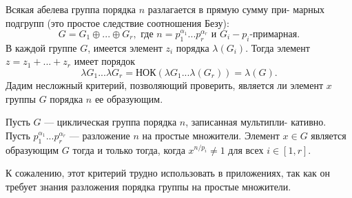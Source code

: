 \documentclass{../template/mai_book}
\begin{document}
Всякая абелева группа порядка $n$ разлагается в прямую сумму при-\linebreak
марных подгрупп (это простое следствие соотношения Безу):\linebreak
$$G = G_1\oplus...\oplus G_r, \text{ где } n=p_1^{\alpha_1}...p_r^{\alpha_r} \text{ и } G_i - p_i \text{-примарная}.$$
В каждой группе $G$, имеется элемент $z_i$ порядка $\lambda(G_i)$. Тогда элемент\linebreak
$z=z_1+...+z_r$ имеет порядок
$$\lambda{G_1}...\lambda{G_r} = \text{НОК}(\lambda{G_1}...\lambda(G_r)) = \lambda(G).$$
\newpage
Дадим несложный критерий, позволяющий проверить, является ли\linebreak
элемент $x$ группы $G$ порядка $n$ ее образующим.
\begin{predl}
Пусть $G$ — циклическая группа порядка $n$, записанная мультипли­-\linebreak
кативно. Пусть $p_1^{\alpha_1}...p_r^{\alpha_r}$ — разложение $n$ на простые множители.\linebreak
Элемент $x \in G$ является образующим $G$ тогда и только тогда, когда\linebreak
$x^{n/p_i} \ne 1$ для всех $i \in [1, r]$.

К сожалению, этот критерий трудно использовать в приложениях,\linebreak
так как он требует знания разложения порядка группы на простые\linebreak
множители.
\end{predl}
\end{document}
